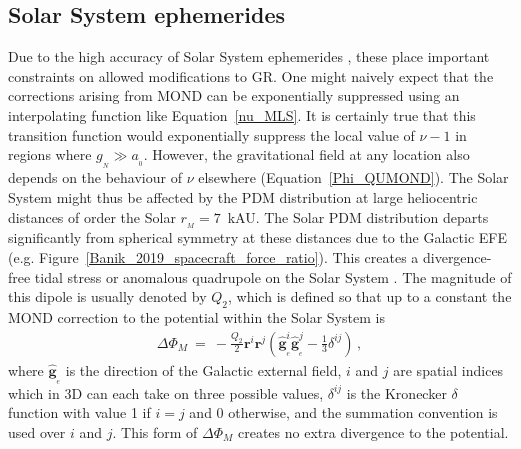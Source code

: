 \documentclass[fleqn,usenatbib,useAMS,onecolumn]{mnras} %
\begin{document}
\subsection{Solar System ephemerides}
\label{Solar_System_ephemerides}

Due to the high accuracy of Solar System ephemerides \citep[e.g.][]{Viswanathan_2017}, these place important constraints on allowed modifications to GR. One might naively expect that the corrections arising from MOND can be exponentially suppressed using an interpolating function like Equation~\ref{nu_MLS}. It is certainly true that this transition function would exponentially suppress the local value of $\nu - 1$ in regions where $g_{_N} \gg a_{_0}$. However, the gravitational field at any location also depends on the behaviour of $\nu$ elsewhere (Equation~\ref{Phi_QUMOND}). The Solar System might thus be affected by the PDM distribution at large heliocentric distances of order the Solar $r_{_M} = 7$~kAU. The Solar PDM distribution departs significantly from spherical symmetry at these distances due to the Galactic EFE (e.g. Figure~\ref{Banik_2019_spacecraft_force_ratio}). This creates a divergence-free tidal stress or anomalous quadrupole on the Solar System \citep{Milgrom_2009}. The magnitude of this dipole is usually denoted by $Q_2$, which is defined so that up to a constant the MOND correction to the potential within the Solar System is
\begin{eqnarray}
    \Delta \Phi_M ~=~ -\frac{Q_2}{2}\bm{r}^i \bm{r}^j \left( \widehat{\bm{g}}_{_e}^i \widehat{\bm{g}}_{_e}^j - \frac{1}{3} \delta^{ij} \right) \, ,
    \label{Q2_definition}
\end{eqnarray}
where $\widehat{\bm{g}}_{_e}$ is the direction of the Galactic external field, $i$ and $j$ are spatial indices which in 3D can each take on three possible values, $\delta^{ij}$ is the Kronecker $\delta$ function with value 1 if $i = j$ and 0 otherwise, and the summation convention is used over $i$ and $j$. This form of $\Delta \Phi_M$ creates no extra divergence to the potential.
\end{document}
